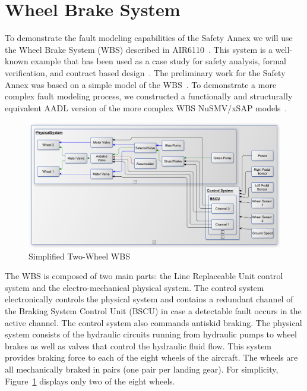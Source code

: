 \section{Wheel Brake System}
\label{sec:wbs}
To demonstrate the fault modeling capabilities of the Safety Annex we will use the Wheel Brake System (WBS) described in AIR6110~\cite{AIR6110}.  This system is a well-known example that has been used as a case study for safety analysis, formal verification, and contract based design~\cite{DBLP:conf/cav/BozzanoCPJKPRT15, 10.1007/978-3-319-11936-6-7, CAV2015:BoCiGrMa, Joshi05:SafeComp}. The preliminary work for the Safety Annex was based on a simple model of the WBS~\cite{Stewart17:IMBSA}. To demonstrate a more complex fault modeling process, we constructed a functionally and structurally equivalent AADL version of the more complex WBS NuSMV/xSAP models~\cite{DBLP:conf/cav/BozzanoCPJKPRT15}.    

\begin{figure}[htbp]
	\centering
	\includegraphics[trim=0 9 0 5,clip,width=\textwidth]{images/wbs_arch4_diagram.pdf}
	\caption{Simplified Two-Wheel WBS}
	\label{fig:wbs}
\end{figure} 

The WBS is composed of two main parts: the Line Replaceable Unit control system and the electro-mechanical physical system.
The control system electronically controls the physical system and contains a redundant
channel of the Braking System Control Unit (BSCU) in case a detectable fault occurs in the active channel.
The control system also commands antiskid braking. %
 The physical system consists of the hydraulic circuits running from hydraulic pumps to wheel brakes as well as valves that control the hydraulic fluid flow. This system provides braking force to each of the eight wheels of the aircraft. The wheels are all mechanically braked in pairs (one pair per landing gear). For simplicity, Figure~\ref{fig:wbs} displays only two of the eight wheels. 

